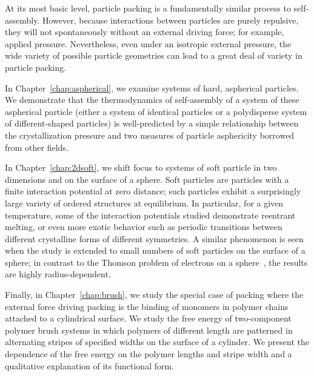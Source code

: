 {At its most basic level, particle packing is a fundamentally similar process to self-assembly.
However, because interactions between particles are purely repulsive, they will not spontaneously without an external driving force; for example, applied pressure.
Nevertheless, even under an isotropic external pressure, the wide variety of possible particle geometries can lead to a great deal of variety in particle packing.

In Chapter~\ref{chap:aspherical}, we examine systems of hard, aspherical particles.
We demonstrate that the thermodynamics of self-assembly of a system of these aspherical particle (either a system of identical particles or a polydisperse system of different-shaped particles) is well-predicted by a simple relationship between the crystallization pressure and two measures of particle asphericity borrowed from other fields.

In Chapter~\ref{chap:2dsoft}, we shift focus to systems of soft particle in two dimensions and on the surface of a sphere.
Soft particles are particles with a finite interaction potential at zero distance; such particles exhibit a surprisingly large variety of ordered structures at equilibrium.
In particular, for a given temperature, some of the interaction potentials studied demonstrate reentrant melting, or even more exotic behavior such as periodic transitions between different crystalline forms of different symmetries.
A similar phenomenon is seen when the study is extended to small numbers of soft particles on the surface of a sphere; in contrast to the Thomson problem of electrons on a sphere~\cite{thomson}, the results are highly radius-dependent.

Finally, in Chapter~\ref{chap:brush}, we study the special case of packing where the external force driving packing is the binding of monomers in polymer chains attached to a cylindrical surface.
We study the free energy of two-component polymer brush systems in which polymers of different length are patterned in alternating stripes of specified widths on the surface of a cylinder.
We present the dependence of the free energy on the polymer lengths and stripe width and a qualitative explanation of its functional form.}
